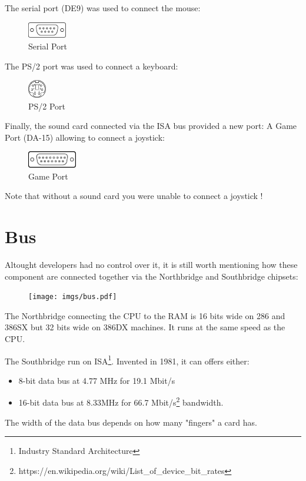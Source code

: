 \documentclass[book.tex]{subfiles}
\begin{document}
The serial port (DE9) was used to connect the mouse:
 \begin{figure}[H]
\centering
\includegraphics[width=0.15\textwidth]{imgs/ports/DE9_serial_port.eps}
%
\caption{Serial Port}
\label{fig:serialPort}
\end{figure}

The PS/2 port was used to connect a keyboard:
 \begin{figure}[H]
\centering
\includegraphics[width=0.07\textwidth]{imgs/ports/MiniDIN-6_PS2.eps}
%
\caption{PS/2 Port}
\label{fig:ps2Port}
\end{figure}


Finally, the sound card connected via the ISA bus provided a new port: A Game Port (DA-15) allowing to connect a joystick:
 \begin{figure}[H]
\centering
\includegraphics[width=0.19\textwidth]{imgs/ports/DA-15_GamePort.eps}
%
\caption{Game Port}
\label{fig:gamePort}
\end{figure}

Note that without a sound card you were unable to connect a joystick !


\section{Bus}
Altought developers had no control over it, it is still worth mentioning how these component are connected together via the Northbridge and Southbridge chipsets:\\ 
\par
\begin{figure}[H]
\centering
      \texttt{[image: imgs/bus.pdf]}
\end{figure}
\par
The Northbridge connecting the CPU to the RAM is 16 bits wide on 286 and 386SX but 32 bits wide on 386DX machines. It runs at the same speed as the CPU.\\
\par
The Southbridge run on ISA\footnote{Industry Standard Architecture}. Invented in 1981, it can offers either:
\begin{itemize}
\item 8-bit data bus at 4.77 MHz  for 19.1 Mbit/s
\item 16-bit data bus at 8.33MHz for 66.7 Mbit/s\footnote{https://en.wikipedia.org/wiki/List\_of\_device\_bit\_rates} bandwidth.
\end{itemize}
The width of the data bus depends on how many "fingers" a card has.\\
\par
\end{document}
